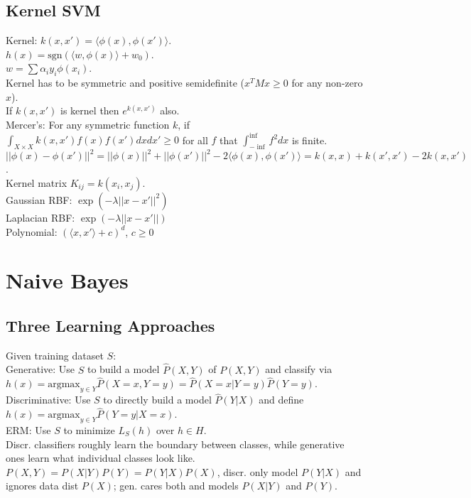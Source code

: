\subsection*{Kernel SVM}

Kernel: $k(x, x') = \langle \phi(x), \phi(x') \rangle$.\\
$h(x) = \text{sgn}(\langle w, \phi(x) \rangle + w_0)$.\\
$w = \sum\alpha_i y_i \phi(x_i)$.\\
Kernel has to be symmetric and positive semidefinite ($x^TMx \geq 0$ for any non-zero $x$).\\
If $k(x, x')$ is kernel then $e^{k(x, x')}$ also.\\
Mercer's: For any symmetric function $k$, if $\int_{X \times X}k(x, x')f(x)f(x')dxdx' \geq 0$ for all $f$ that $\int_{-\inf}^{\inf}f^2dx$ is finite.\\
$||\phi(x) - \phi(x')||^2 = ||\phi(x)||^2+||\phi(x')||^2-2\langle \phi(x), \phi(x')\rangle = k(x, x) + k(x', x') - 2k(x, x')$.\\
Kernel matrix $K_{ij} = k(x_i, x_j)$.\\
Gaussian RBF: $\exp(-\lambda ||x - x'||^2)$\\
Laplacian RBF: $\exp(-\lambda ||x - x'||)$\\
Polynomial: $(\langle x, x' \rangle + c)^d$, $c \geq 0$

\section{Naive Bayes}

\subsection*{Three Learning Approaches}

Given training dataset $S$:\\
Generative: Use $S$ to build a model $\hat{P}(X,Y)$ of $P(X,Y)$ and classify via $h(x) = \text{argmax}_{y \in Y} \hat{P}(X=x, Y=y) = \hat{P}(X=x|Y=y) \hat{P}(Y=y)$.\\
Discriminative: Use $S$ to directly build a model $\hat{P}(Y|X)$ and define $h(x) = \text{argmax}_{y\in Y} \hat{P}(Y=y|X=x)$.\\
ERM: Use $S$ to minimize $L_S(h)$ over $h \in H$.\\
Discr. classifiers roughly learn the boundary between classes, while generative ones learn what individual classes look like.\\
$P(X,Y)=P(X|Y)P(Y) = P(Y|X)P(X)$, discr. only model $P(Y|X)$ and ignores data dist $P(X)$; gen. cares both and models $P(X|Y)$ and $P(Y)$.

